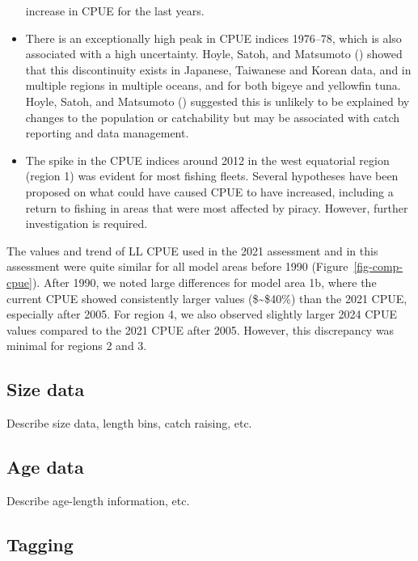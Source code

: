 \documentclass[
]{scrartcl}
\begin{document}
\begin{itemize}
  increase in CPUE for the last years.
\item
  There is an exceptionally high peak in CPUE indices 1976--78, which is
  also associated with a high uncertainty. Hoyle, Satoh, and Matsumoto
  () showed that
  this discontinuity exists in Japanese, Taiwanese and Korean data, and
  in multiple regions in multiple oceans, and for both bigeye and
  yellowfin tuna. Hoyle, Satoh, and Matsumoto
  () suggested this
  is unlikely to be explained by changes to the population or
  catchability but may be associated with catch reporting and data
  management.
\item
  The spike in the CPUE indices around 2012 in the west equatorial
  region (region 1) was evident for most fishing fleets. Several
  hypotheses have been proposed on what could have caused CPUE to have
  increased, including a return to fishing in areas that were most
  affected by piracy. However, further investigation is required.
\end{itemize}

The values and trend of LL CPUE used in the 2021 assessment and in this
assessment were quite similar for all model areas before 1990
(Figure~\ref{fig-comp-cpue}). After 1990, we noted large differences for
model area 1b, where the current CPUE showed consistently larger values
(\$\sim\$40\%) than the 2021 CPUE, especially after 2005. For region 4,
we also observed slightly larger 2024 CPUE values compared to the 2021
CPUE after 2005. However, this discrepancy was minimal for regions 2 and
3.

\subsection{Size data}\label{size-data}

Describe size data, length bins, catch raising, etc.

\subsection{Age data}\label{age-data}

Describe age-length information, etc.

\subsection{Tagging}\label{tagging}
\end{document}
